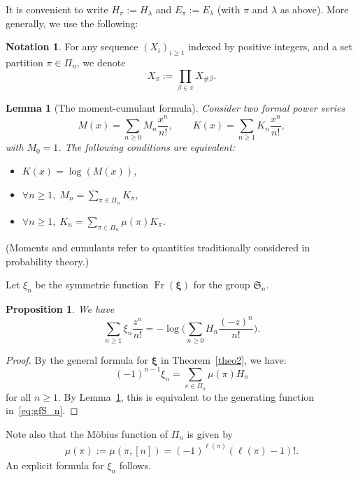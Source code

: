 \documentclass[11pt]{article}
\newtheorem{lemm}[theo]{Lemma}
\newtheorem{prop}[theo]{Proposition}
\theoremstyle{definition}
\newtheorem{nota}[theo]{Notation}
\DeclareMathOperator{\Fr}{Fr}
\newcommand{\bxi}{\boldsymbol{\xi}}
\begin{document}
It is convenient to write $H_\pi := H_\lambda$ and $E_\pi := E_\lambda$ (with $\pi$ and $\lambda$ as above).  More generally, we use the following:

\begin{nota}
    For any sequence $(X_i)_{i \geq 1}$ indexed by positive integers, and a set partition $\pi \in \Pi_n$, we denote
    \[
        X_\pi := \prod_{\beta \in \pi} X_{\#\beta}.
    \]
\end{nota}

\begin{lemm}[The moment-cumulant formula] \label{lemm:momentcumulant}
    Consider two formal power series
    \[
        M(x) = \sum_{n\geq 0} M_n \frac{x^n}{n!},
            \qquad
        K(x) = \sum_{n\geq 1} K_n \frac{x^n}{n!},
    \]
    with $M_0=1$.  The following conditions are equivalent:
    \begin{itemize}
        \item $K(x) = \log(M(x))$,
        \item $\forall n \geq 1, \; M_n = \sum_{\pi \in \Pi_n} K_\pi$,
        \item
        $\forall n \geq 1, \; K_n = \sum_{\pi \in \Pi_n} \mu(\pi) K_\pi$.
    \end{itemize}
\end{lemm}

(Moments and cumulants refer to quantities traditionally considered in probability theory.)

Let $\xi_n$ be the symmetric function $\Fr(\bxi)$ for the group $\mathfrak{S}_n$. 

\begin{prop}
    We have
    \begin{equation} \label{eq:gfS_n}
        \sum_{n\geq 1} \xi_n \frac{z^n}{n!}
            =
        -\log\bigg( \sum_{n\geq 0} H_n \frac{(-z)^n}{n!} \bigg).
    \end{equation}
\end{prop}

\begin{proof}
    By the general formula for $\bxi$ in Theorem~\ref{theo2}, we have:
    \[
        (-1)^{n-1} \xi_n = \sum_{\pi\in\Pi_n} \mu(\pi) H_\pi
    \]
    for all $n\geq 1$.   By Lemma~\ref{lemm:momentcumulant}, this is equivalent to the generating function in~\eqref{eq:gfS_n}.
\end{proof}

Note also that the Möbius function of $\Pi_n$ is given by
\begin{align} \label{eq:pin_mob}
    \mu(\pi):=\mu(\pi,[n])
        =
    (-1)^{\ell(\pi)} (\ell(\pi)-1)!.
\end{align}
An explicit formula for $\xi_n$ follows.
\end{document}
